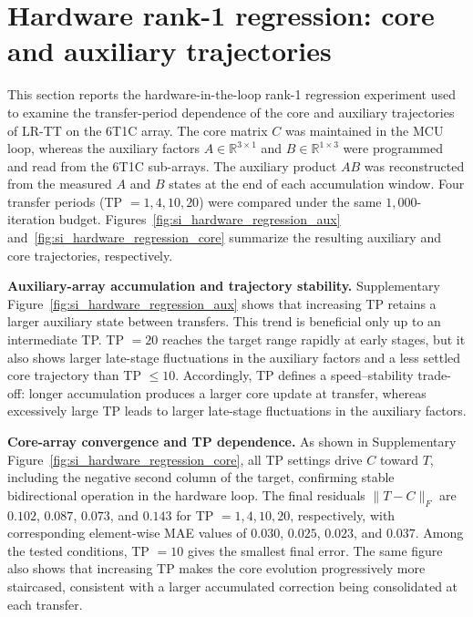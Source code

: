 \documentclass[AMA,LATO1COL]{WileyNJDv5}
\newcommand{\SIEndSection}{\FloatBarrier\clearpage}
\begin{document}
\SIEndSection
\section[Hardware rank-1 regression: core and auxiliary trajectories]
{Hardware rank-1 regression: core and auxiliary trajectories}
\label{sec:si_hardware_regression}

\noindent
This section reports the hardware-in-the-loop rank-1 regression experiment used to examine the transfer-period dependence of the core and auxiliary trajectories of LR-TT on the 6T1C array. The core matrix $C$ was maintained in the MCU loop, whereas the auxiliary factors $A\in\mathbb{R}^{3\times1}$ and $B\in\mathbb{R}^{1\times3}$ were programmed and read from the 6T1C sub-arrays. The auxiliary product $AB$ was reconstructed from the measured $A$ and $B$ states at the end of each accumulation window. Four transfer periods (TP $=1,4,10,20$) were compared under the same $1{,}000$-iteration budget. Figures~\ref{fig:si_hardware_regression_aux} and~\ref{fig:si_hardware_regression_core} summarize the resulting auxiliary and core trajectories, respectively.

\noindent\textbf{Auxiliary-array accumulation and trajectory stability.}
Supplementary Figure~\ref{fig:si_hardware_regression_aux} shows that increasing TP retains a larger auxiliary state between transfers. This trend is beneficial only up to an intermediate TP. TP $=20$ reaches the target range rapidly at early stages, but it also shows larger late-stage fluctuations in the auxiliary factors and a less settled core trajectory than TP $\le 10$. Accordingly, TP defines a speed--stability trade-off: longer accumulation produces a larger core update at transfer, whereas excessively large TP leads to larger late-stage fluctuations in the auxiliary factors.

\noindent\textbf{Core-array convergence and TP dependence.}
As shown in Supplementary Figure~\ref{fig:si_hardware_regression_core}, all TP settings drive $C$ toward $T$, including the negative second column of the target, confirming stable bidirectional operation in the hardware loop. The final residuals $\|T-C\|_F$ are $0.102$, $0.087$, $0.073$, and $0.143$ for TP $=1,4,10,20$, respectively, with corresponding element-wise MAE values of $0.030$, $0.025$, $0.023$, and $0.037$. Among the tested conditions, TP $=10$ gives the smallest final error. The same figure also shows that increasing TP makes the core evolution progressively more staircased, consistent with a larger accumulated correction being consolidated at each transfer.
\end{document}
